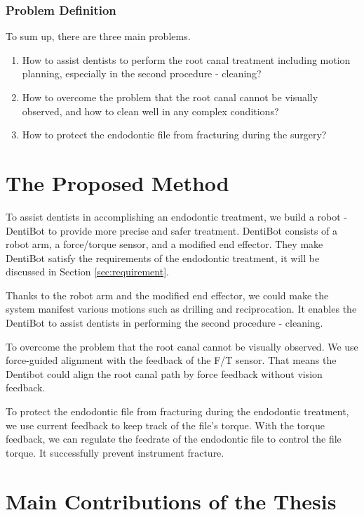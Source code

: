 \subsubsection{Problem Definition}
\hspace*{6mm}To sum up, there are three main problems.
\begin{enumerate}
\item How to assist dentists to perform the root canal treatment including motion planning, especially in the second procedure - cleaning?
\item How to overcome the problem that the root canal cannot be visually observed, and how to clean well in any complex conditions?
\item How to protect the endodontic file from fracturing during the surgery?
\end{enumerate}	
\section{The Proposed Method}
\hspace*{6mm}To assist dentists in accomplishing an endodontic treatment, we build a robot - DentiBot to provide more precise and safer treatment. DentiBot consists of a robot arm, a force/torque sensor, and a modified end effector. They make DentiBot satisfy the requirements of the endodontic treatment, it will be discussed in Section \ref{sec:requirement}. 
\par
Thanks to the robot arm and the modified end effector, we could make the system manifest various motions such as drilling and reciprocation. It enables the DentiBot to assist dentists in performing the second procedure - cleaning.
\par
To overcome the problem that the root canal cannot be visually observed. We use force-guided alignment with the feedback of the F/T sensor. That means the Dentibot could align the root canal path by force feedback without vision feedback.
\par
To protect the endodontic file from fracturing during the endodontic treatment, we use current feedback to keep track of the file's torque. With the torque feedback, we can regulate the feedrate of the endodontic file to control the file torque. It successfully prevent instrument fracture.
\section{Main Contributions of the Thesis}
\label{sec:contributions}
